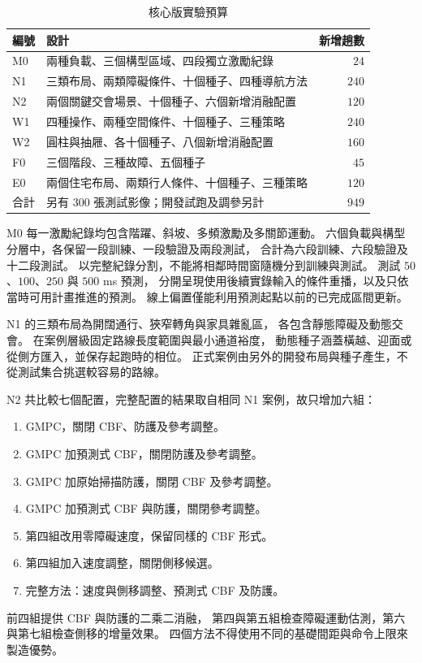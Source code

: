 \begin{table}[htbp]
    \centering
    \caption{核心版實驗預算}
    \small
    \renewcommand{\arraystretch}{1.2}
    \begin{tabular}{l p{} r}
        \hline
        編號 & 設計 & 新增趟數 \\
        \hline
        M0 & 兩種負載、三個構型區域、四段獨立激勵紀錄 & $24$ \\
        N1 & 三類布局、兩類障礙條件、十個種子、四種導航方法 & $240$ \\
        N2 & 兩個關鍵交會場景、十個種子、六個新增消融配置 & $120$ \\
        W1 & 四種操作、兩種空間條件、十個種子、三種策略 & $240$ \\
        W2 & 圓柱與抽屜、各十個種子、八個新增消融配置 & $160$ \\
        F0 & 三個階段、三種故障、五個種子 & $45$ \\
        E0 & 兩個住宅布局、兩類行人條件、十個種子、三種策略 & $120$ \\
        \hline
        合計 & 另有 $300$ 張測試影像；開發試跑及調參另計 & $949$ \\
        \hline
    \end{tabular}
\end{table}

M0 每一激勵紀錄均包含階躍、斜坡、多頻激勵及多關節運動。
六個負載與構型分層中，各保留一段訓練、一段驗證及兩段測試，
合計為六段訓練、六段驗證及十二段測試。
以完整紀錄分割，不能將相鄰時間窗隨機分到訓練與測試。
測試 $50$、$100$、$250$ 與 $500$ ms 預測，
分開呈現使用後續實錄輸入的條件重播，以及只依當時可用計畫推進的預測。
線上偏置僅能利用預測起點以前的已完成區間更新。

N1 的三類布局為開闊通行、狹窄轉角與家具雜亂區，
各包含靜態障礙及動態交會。
在案例層級固定路線長度範圍與最小通道裕度，
動態種子涵蓋橫越、迎面或從側方匯入，並保存起跑時的相位。
正式案例由另外的開發布局與種子產生，不從測試集合挑選較容易的路線。

N2 共比較七個配置，完整配置的結果取自相同 N1 案例，故只增加六組：
\begin{enumerate}
    \item GMPC，關閉 CBF、防護及參考調整。
    \item GMPC 加預測式 CBF，關閉防護及參考調整。
    \item GMPC 加原始掃描防護，關閉 CBF 及參考調整。
    \item GMPC 加預測式 CBF 與防護，關閉參考調整。
    \item 第四組改用零障礙速度，保留同樣的 CBF 形式。
    \item 第四組加入速度調整，關閉側移候選。
    \item 完整方法：速度與側移調整、預測式 CBF 及防護。
\end{enumerate}
前四組提供 CBF 與防護的二乘二消融，
第四與第五組檢查障礙運動估測，第六與第七組檢查側移的增量效果。
四個方法不得使用不同的基礎間距與命令上限來製造優勢。

